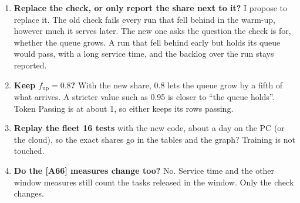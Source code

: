 \documentclass[11pt,a4paper]{article}
\begin{document}
\begin{enumerate}[leftmargin=1.4em]
\item \textbf{Replace the check, or only report the share next to it?} I propose to replace it. The
  old check fails every run that fell behind in the warm-up, however much it serves later. The new one
  asks the question the check is for, whether the queue grows. A run that fell behind early but holds
  its queue would pass, with a long service time, and the backlog over the run stays reported.
\item \textbf{Keep $f_{\mathrm{up}} = 0.8$?} With the new share, 0.8 lets the queue grow by a fifth of
  what arrives. A stricter value such as 0.95 is closer to ``the queue holds''. Token Passing is at
  about 1, so either keeps its rows passing.
\item \textbf{Replay the fleet 16 tests} with the new code, about a day on the PC (or the cloud), so the
  exact shares go in the tables and the graph? Training is not touched.
\item \textbf{Do the [A66] measures change too?} No. Service time and the other window measures still
  count the tasks released in the window. Only the check changes.
\end{enumerate}
\end{document}
